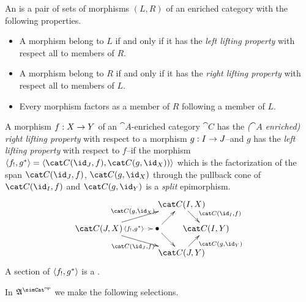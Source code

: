 \documentclass[csh.tex]{subfiles}
\begin{document}
\begin{definition}
An  is a pair of sets of morphisms $(L,R)$ of an enriched category with the following properties.
\begin{itemize}
\item A morphism belong to $L$ if and only if it has the \emph{left lifting property} with respect all to members of $R$.
\item A morphism belong to $R$ if and only if it has the \emph{right lifting property} with respect all to members of $L$.
\item Every morphism factors as a member of $R$ following a member of $L$.
\end{itemize}

A morphism $f: X\to Y$ of an $\cat A$-enriched category $\cat C$ has the \emph{($\cat A$ enriched) right lifting property} with respect to a morphism $g: I\to J$--and $g$ has the \emph{left lifting property} with respect to $f$--if the morphism $\tuplet{f_!,g\ri} = \tuplet{\cat C(\id_J,f),\cat C(g,\id_X))}$ which is the factorization of the span $\cat C(\id_J,f)$, $\cat C(g,\id_X)$ through the pullback cone of $\cat C(\id_I,f)$ and $\cat C(g,\id_Y)$ is a \emph{split} epimorphism.
\[\xy
(34,20)*+{\cat C(I,X)}="top",(0,10)*+{\cat C(J,X)}="left",(24,10)*+{\bullet}="middle",(44,10)*+{\cat C(I,Y)}="right",(34,0)*+{\cat C(J,Y)}="bottom"
\ar^{\cat C(g,\id_X)} "left";"top" \ar@{.>}|(.6){\tuplet{f_!,g\ri}} "left";"middle" \ar_{\cat C(\id_J,f)} "left";"bottom" \ar "middle";"bottom"
\ar "middle";"top" \ar^(.6){\cat C(\id_I,f)} "top";"right" \ar_(.6){\cat C(g,\id_Y)} "bottom";"right"
\endxy\]
A section of $\left\langle f_!,g^* \right\rangle$ is a .
\end{definition}

In $\ambient\s$ we make the following selections. 
\end{document}
